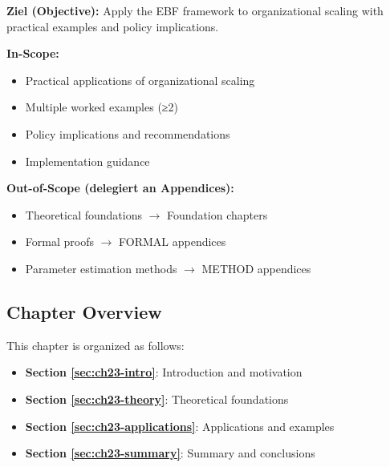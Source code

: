 \begin{tcolorbox}[
    colback=purple!5!white,
    colframe=purple!75!black,
    title={\textbf{Chapter Scope: Ziel / In-Scope / Out-of-Scope}},
    fonttitle=\bfseries
]

\textbf{Ziel (Objective):}
Apply the EBF framework to organizational scaling with practical examples and policy implications.

\vspace{0.3cm}
\textbf{In-Scope:}
\begin{itemize}[nosep]
    \item Practical applications of organizational scaling
    \item Multiple worked examples (≥2)
    \item Policy implications and recommendations
    \item Implementation guidance
\end{itemize}

\vspace{0.3cm}
\textbf{Out-of-Scope (delegiert an Appendices):}
\begin{itemize}[nosep]
    \item Theoretical foundations $\rightarrow$ Foundation chapters
    \item Formal proofs $\rightarrow$ FORMAL appendices
    \item Parameter estimation methods $\rightarrow$ METHOD appendices
\end{itemize}

\end{tcolorbox}



\subsection*{Chapter Overview}

This chapter is organized as follows:

\begin{itemize}
\item \textbf{Section \ref{sec:ch23-intro}}: Introduction and motivation
\item \textbf{Section \ref{sec:ch23-theory}}: Theoretical foundations
\item \textbf{Section \ref{sec:ch23-applications}}: Applications and examples
\item \textbf{Section \ref{sec:ch23-summary}}: Summary and conclusions
\end{itemize}



